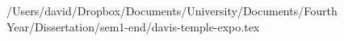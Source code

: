 /Users/david/Dropbox/Documents/University/Documents/Fourth Year/Dissertation/sem1-end/davis-temple-expo.tex